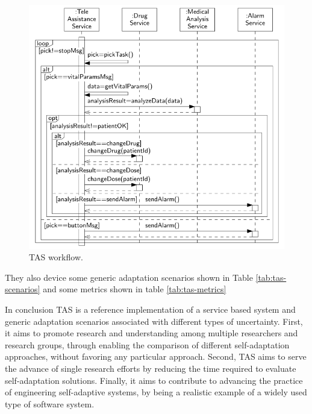 \begin{figure}[ht]
	\centerline
	{\includegraphics[scale=0.55]{img/tas-workflow.png}}
	\caption[TAS Workflow]{TAS workflow\cite{teleassist}.}
	\label{fig:tas-workflow}
\end{figure}

They also device some generic adaptation scenarios shown in Table \ref{tab:tas-scenarios} and some metrics shown in table \ref{tab:tas-metrics}

In conclusion TAS is a reference implementation of a service based system and generic adaptation scenarios associated with different types of uncertainty. First, it aims to promote research and understanding among multiple researchers and research groups, through enabling the comparison of different self-adaptation approaches, without favoring any particular approach. Second, TAS aims to serve the advance of single research efforts by reducing the time required to evaluate self-adaptation solutions. Finally, it aims to contribute to advancing the practice of engineering self-adaptive systems, by being a realistic example of a widely used type of software system.

